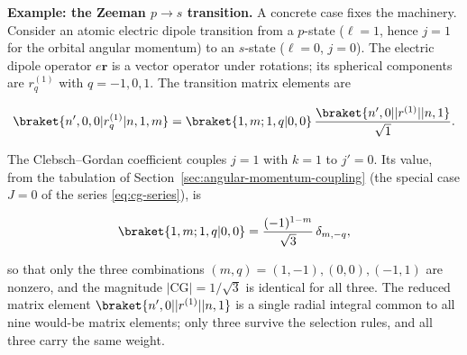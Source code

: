 \medskip\noindent\textbf{Example: the Zeeman $p\to s$ transition.} A concrete case fixes the machinery. Consider an atomic electric dipole transition from a $p$-state ($\ell=1$, hence $j=1$ for the orbital angular momentum) to an $s$-state ($\ell=0$, $j=0$). The electric dipole operator $e\bm r$ is a vector operator under rotations; its spherical components are $r^{(1)}_q$ with $q = -1,0,1$. The transition matrix elements are
\begin{linenomath}
\begin{equation*}
\braket{n',0,0|r^{(1)}_q|n,1,m}
= \braket{1,m;1,q|0,0}\,
  \frac{\braket{n',0||r^{(1)}||n,1}}{\sqrt{1}} .
\end{equation*}
\end{linenomath}
The Clebsch--Gordan coefficient couples $j=1$ with $k=1$ to $j'=0$. Its value, from the tabulation of Section~\ref{sec:angular-momentum-coupling} (the special case $J=0$ of the series \eqref{eq:cg-series}), is
\begin{linenomath}
\begin{equation*}
\braket{1,m;1,q|0,0} = \frac{(-1)^{1-m}}{\sqrt{3}}\,\delta_{m,-q},
\end{equation*}
\end{linenomath}
so that only the three combinations $(m,q) = (1,-1), (0,0), (-1,1)$ are nonzero, and the magnitude $|\text{CG}| = 1/\sqrt{3}$ is identical for all three. The reduced matrix element $\braket{n',0||r^{(1)}||n,1}$ is a single radial integral common to all nine would-be matrix elements; only three survive the selection rules, and all three carry the same weight.

